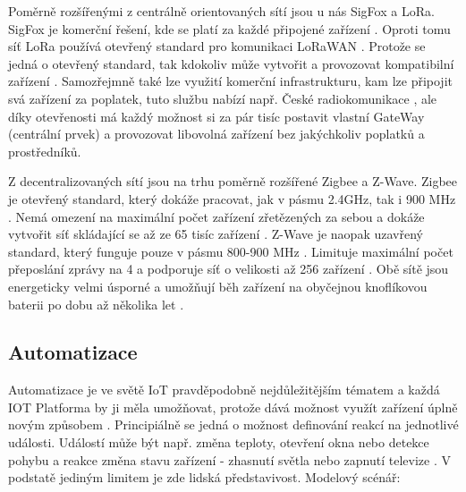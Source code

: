Poměrně rozšířenými z centrálně orientovaných sítí jsou u nás SigFox a LoRa. SigFox je komerční řešení, kde se platí za každé připojené zařízení \cite{sigfox-price}. Oproti tomu síť LoRa používá otevřený standard pro komunikaci LoRaWAN \cite{lora}. Protože se jedná o otevřený standard, tak kdokoliv může vytvořit a provozovat kompatibilní zařízení \cite{lora}. Samozřejmně také lze využití komerční infrastrukturu, kam lze připojit svá zařízení za poplatek, tuto službu nabízí např. České radiokomunikace \cite{cra}, ale díky otevřenosti má každý možnost si za pár tisíc postavit vlastní GateWay (centrální prvek) a provozovat libovolná zařízení bez jakýchkoliv poplatků a prostředníků.

Z decentralizovaných sítí jsou na trhu poměrně rozšířené Zigbee a Z-Wave. Zigbee je otevřený standard, který dokáže pracovat, jak v pásmu 2.4GHz, tak i 900 MHz \cite{zigbee}. Nemá omezení na maximální počet zařízení zřetězených za sebou a dokáže vytvořit síť skládající se až ze 65 tisíc zařízení \cite{zigbee}. Z-Wave je naopak uzavřený standard, který funguje pouze v pásmu 800-900 MHz \cite{zwave}. Limituje maximální počet přeposlání zprávy na 4 a podporuje síť o velikosti až 256 zařízení \cite{zwave}. Obě sítě jsou energeticky velmi úsporné a umožňují běh zařízení na obyčejnou knoflíkovou baterii po dobu až několika let \cite{zigbee, zwave}.

\subsection{Automatizace}
Automatizace je ve světě IoT pravděpodobně nejdůležitějším tématem a každá IOT Platforma by ji měla umožňovat, protože dává možnost využít zařízení úplně novým způsobem \cite{what-future-hold}. Principiálně se jedná o možnost definování reakcí na jednotlivé události. Událostí může být např. změna teploty, otevření okna nebo detekce pohybu a reakce změna stavu zařízení - zhasnutí světla nebo zapnutí televize \cite{what-future-hold}. V podstatě jediným limitem je zde lidská představivost. Modelový scénář:

